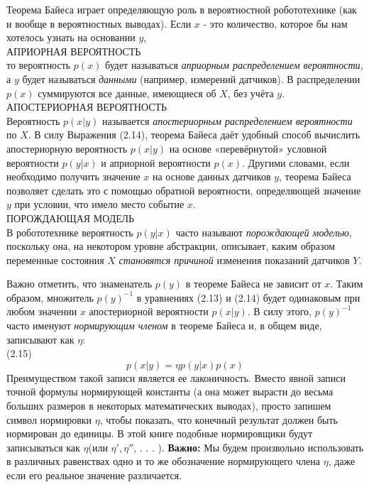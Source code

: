 \documentclass[10pt,a4paper]{article}
\begin{document}
 Теорема Байеса играет определяющую роль в вероятностной робототехнике (как и вообще в вероятностных выводах). Если $x$  - это количество, которое бы нам хотелось узнать на основании $y$,\\
 АПРИОРНАЯ ВЕРОЯТНОСТЬ\\
 то вероятность $p(x)$ будет называться \textit{априорным распределением вероятности}, а $y$ будет называться \textit{данными} (например, измерений датчиков). В распределении $p(x)$ суммируются все данные, имеющиеся об $X$, без учёта $y$.\\
 АПОСТЕРИОРНАЯ ВЕРОЯТНОСТЬ\\
 Вероятность $p(x | y)$ называется \textit{апостериорным распределением вероятности} по $X$.
 В силу Выражения (2.14), теорема Байеса даёт удобный способ вычислить апостериорную вероятность $p(x | y)$ на основе «перевёрнутой» условной вероятности $p(y | x)$ и априорной вероятности $p(x)$. Другими словами, если необходимо получить значение $x$ на основе данных датчиков $y$, теорема Байеса позволяет сделать это с помощью обратной вероятности, определяющей значение $y$ при условии, что имело место событие $x$.\\
 ПОРОЖДАЮЩАЯ МОДЕЛЬ\\
 В робототехнике вероятность $p(y | x)$ часто называют \textit{порождающей моделью}, поскольку она, на некотором уровне абстракции, описывает, каким образом переменные состояния $X$ \textit{становятся причиной} изменения показаний датчиков $Y$.
 
 Важно отметить, что знаменатель $p(y)$ в теореме Байеса не зависит от $x$. Таким образом, множитель $p(y)^{-1}$ в уравнениях (2.13) и (2.14) будет одинаковым при любом значении $x$ апостериорной вероятности $p(x | y)$. В силу этого, $p(y)^{-1}$ часто именуют  \textit{нормирующим членом} в теореме Байеса и, в общем виде, записывают как $\eta$:\\

 (2.15) $$p(x | y)=\eta p(y | x) p(x)$$
 Преимуществом такой записи является ее лаконичность. Вместо явной записи точной формулы нормирующей константы (а она может вырасти до весьма больших размеров в некоторых математических выводах), просто запишем символ нормировки $ \eta $, чтобы показать, что конечный результат должен быть нормирован до единицы. В этой книге подобные нормировщики будут записываться как $\eta$(или $\eta', \eta''$, . . . ). 
 \textbf{Важно:} Мы будем произвольно использовать в различных равенствах одно и то же обозначение нормирующего члена $ \eta $, даже если его реальное значение различается.
 
\end{document}
